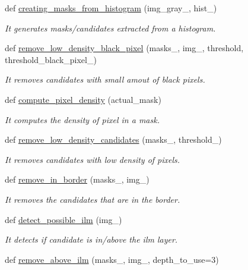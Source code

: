 \begin{DoxyCompactItemize}
def \hyperlink{namespaceDetectionSNF_a2bc34b5e9045fd13135f19c5749c0fe7}{creating\+\_\+masks\+\_\+from\+\_\+histogram} (img\+\_\+gray\+\_\+, hist\+\_\+)
\begin{DoxyCompactList}\small\item\em It generates masks/candidates extracted from a histogram. \end{DoxyCompactList}\item 
def \hyperlink{namespaceDetectionSNF_a1de992bc5826d3455176322541c55757}{remove\+\_\+low\+\_\+density\+\_\+black\+\_\+pixel} (masks\+\_\+, img\+\_\+, threshold, threshold\+\_\+black\+\_\+pixel\+\_\+)
\begin{DoxyCompactList}\small\item\em It removes candidates with small amout of black pixels. \end{DoxyCompactList}\item 
def \hyperlink{namespaceDetectionSNF_a236f312523023cd5810fcdfcab35c2be}{compute\+\_\+pixel\+\_\+density} (actual\+\_\+mask)
\begin{DoxyCompactList}\small\item\em It computes the density of pixel in a mask. \end{DoxyCompactList}\item 
def \hyperlink{namespaceDetectionSNF_aa6cb58bca203d95d4bbcdd98d440d644}{remove\+\_\+low\+\_\+density\+\_\+candidates} (masks\+\_\+, threshold\+\_\+)
\begin{DoxyCompactList}\small\item\em It removes candidates with low density of pixels. \end{DoxyCompactList}\item 
def \hyperlink{namespaceDetectionSNF_a42d7ffedca2b057f47f9362873acba78}{remove\+\_\+in\+\_\+border} (masks\+\_\+, img\+\_\+)
\begin{DoxyCompactList}\small\item\em It removes the candidates that are in the border. \end{DoxyCompactList}\item 
def \hyperlink{namespaceDetectionSNF_ad77677096bdfa2efd74b387c0b3ec972}{detect\+\_\+possible\+\_\+ilm} (img\+\_\+)
\begin{DoxyCompactList}\small\item\em It detects if candidate is in/above the ilm layer. \end{DoxyCompactList}\item 
def \hyperlink{namespaceDetectionSNF_a16b9d2a55f99e589adf8ba260834089d}{remove\+\_\+above\+\_\+ilm} (masks\+\_\+, img\+\_\+, depth\+\_\+to\+\_\+use=3)

\end{DoxyCompactItemize}
